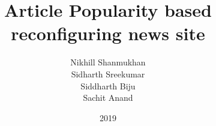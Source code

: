 \documentclass{beamer}
\title{Article Popularity based reconfiguring news site}
\author{ Nikhill Shanmukhan \\ Sidharth Sreekumar \\ Siddharth Biju \\  Sachit Anand }
\institute{\ Federal Institute of Science And Technology (FISAT)®}
\date{2019}
\begin{document}
 
 
\frame{\titlepage}









\end{document}
